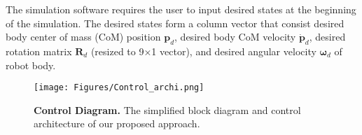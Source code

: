 The simulation software requires the user to input desired states at the beginning of the simulation. The desired states form a column vector that consist desired body center of mass (CoM) position $\bm p_d$, desired body CoM velocity $\bm {\dot p}_d$, desired rotation matrix $\bm R_d$ (resized to 9×1 vector), and desired angular velocity $\bm {\omega}_d$ of robot body. 

\begin{figure}[h]
	\hspace{0.2cm}
		\center
		\texttt{[image: Figures/Control\_archi.png]}
		\caption{{\bfseries Control Diagram.} The simplified block diagram and control architecture of our proposed approach.}
		\label{fig:controlArchi}
	\end{figure}

